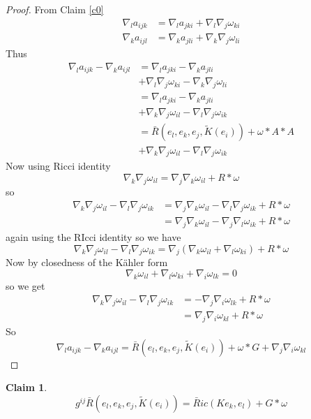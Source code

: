 \documentclass[12pt,letterpaper]{amsart}%
\newcounter{mycounter}
\numberwithin{mycounter}{section}
\theoremstyle{plain}
\newtheorem{claim}[mycounter]{Claim}
\numberwithin{equation}{section}
\theoremstyle{definition}
\begin{document}
\begin{proof}
From Claim \ref{c0}%
\begin{align*}
\nabla_{l}a_{ijk}  &  =\nabla_{l}a_{jki}+\nabla_{l}\nabla_{j}\omega_{ki}\\
\nabla_{k}a_{ijl}  &  =\nabla_{k}a_{jli}+\nabla_{k}\nabla_{j}\omega_{li}%
\end{align*}
Thus
\begin{align*}
\nabla_{l}a_{ijk}-\nabla_{k}a_{ijl}  &  =\nabla_{l}a_{jki}-\nabla_{k}a_{jli}\\
&  +\nabla_{l}\nabla_{j}\omega_{ki}-\nabla_{k}\nabla_{j}\omega_{li}\\
&  =\nabla_{l}a_{jki}-\nabla_{k}a_{jli}\\
&  +\nabla_{k}\nabla_{j}\omega_{il}-\nabla_{l}\nabla_{j}\omega_{ik}\\
&  =\bar{R}(e_{l},e_{k},e_{j},\tilde{K}(e_{i}))+\omega\ast A\ast A\\
&  +\nabla_{k}\nabla_{j}\omega_{il}-\nabla_{l}\nabla_{j}\omega_{ik}%
\end{align*}
Now using Ricci identity%
\[
\nabla_{k}\nabla_{j}\omega_{il}=\nabla_{j}\nabla_{k}\omega_{il}+R\ast\omega
\]
so
\begin{align*}
\nabla_{k}\nabla_{j}\omega_{il}-\nabla_{l}\nabla_{j}\omega_{ik}  &
=\nabla_{j}\nabla_{k}\omega_{il}-\nabla_{l}\nabla_{j}\omega_{ik}+R\ast\omega\\
&  =\nabla_{j}\nabla_{k}\omega_{il}-\nabla_{j}\nabla_{l}\omega_{ik}%
+R\ast\omega
\end{align*}
again using the RIcci identity so we have%
\[
\nabla_{k}\nabla_{j}\omega_{il}-\nabla_{l}\nabla_{j}\omega_{ik}=\nabla
_{j}\left(  \nabla_{k}\omega_{il}+\nabla_{l}\omega_{ki}\right)  +R\ast\omega
\]
Now by closedness of the K\"{a}hler form%
\[
\nabla_{k}\omega_{il}+\nabla_{l}\omega_{ki}+\nabla_{i}\omega_{lk}=0
\]
so we get%
\begin{align*}
\nabla_{k}\nabla_{j}\omega_{il}-\nabla_{l}\nabla_{j}\omega_{ik}  &
=-\nabla_{j}\nabla_{i}\omega_{lk}+R\ast\omega\\
&  =\nabla_{j}\nabla_{i}\omega_{kl}+R\ast\omega
\end{align*}
So
\[
\nabla_{l}a_{ijk}-\nabla_{k}a_{ijl}=\bar{R}(e_{l},e_{k},e_{j},\tilde{K}%
(e_{i}))+\omega\ast G+\nabla_{j}\nabla_{i}\omega_{kl}%
\]

\end{proof}


\begin{claim}
\bigskip\label{c5}
\[
g^{ij}\bar{R}(e_{l},e_{k},e_{j},\tilde{K}(e_{i}))=\bar{R}ic(Ke_{k}%
,e_{l})+G\ast\omega
\]

\end{claim}
\end{document}
